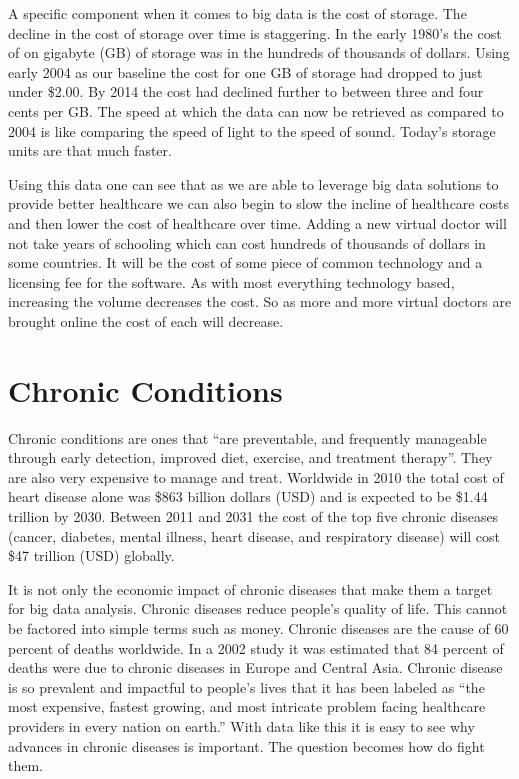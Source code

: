 \documentclass[sigconf]{acmart}
\begin{document}
A specific component when it comes to big data is the cost of storage.  
The decline in the cost of storage over time is staggering.  In the 
early 1980's the cost of on gigabyte (GB) of storage was in the hundreds 
of thousands of dollars.  Using early 2004 as our baseline the cost for 
one GB of storage had dropped to just under \$2.00.  By 2014 the cost 
had declined further to between three and four cents per GB\cite{MKomo}.  
The speed at which the data can now be retrieved as compared to 2004 
is like comparing the speed of light to the speed of sound.  Today's 
storage units are that much faster.

Using this data one can see that as we are able to leverage big data 
solutions to provide better healthcare we can also begin to slow the 
incline of healthcare costs and then lower the cost of healthcare 
over time.  Adding a new virtual doctor will not take years of 
schooling which can cost hundreds of thousands of dollars in some 
countries.  It will be the cost of some piece of common technology 
and a licensing fee for the software.  As with most everything 
technology based, increasing the volume decreases the cost.  So as 
more and more virtual doctors are brought online the cost of each 
will decrease.  

\section{Chronic Conditions}
Chronic conditions are ones that ``are preventable, and frequently 
manageable through early detection, improved diet, exercise, and 
treatment therapy''\cite{FightChronicDisease}.  They are also very 
expensive to manage and treat.  Worldwide in 2010 the total cost of 
heart disease alone was \$863 billion dollars (USD) and is expected 
to be \$1.44 trillion by 2030.  Between 2011 and 2031 the cost of the 
top five chronic diseases (cancer, diabetes, mental illness, heart 
disease, and respiratory disease) will cost \$47 trillion (USD) 
globally\cite{Reuters}.  

It is not only the economic impact of chronic diseases that make them 
a target for big data analysis.  Chronic diseases reduce people's 
quality of life.  This cannot be factored into simple terms such as 
money.  Chronic diseases are the cause of 60 percent of deaths 
worldwide\cite{WHOChronicDisease}.  In a 2002 study it was estimated 
that 84 percent of deaths were due to chronic diseases in Europe and 
Central Asia\cite{PRB}.  Chronic disease is so prevalent and impactful 
to people's lives that it has been labeled as ``the most expensive, 
fastest growing, and most intricate problem facing healthcare providers 
in every nation on earth\cite{HITAnalyticsHow}.''  With data like this 
it is easy to see why advances in chronic diseases is important.  The 
question becomes how do fight them.  
\end{document}
